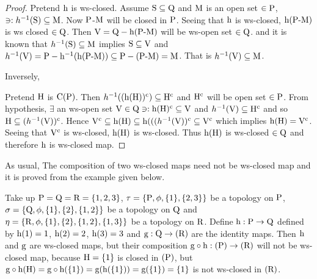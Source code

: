 \begin{proof}
Pretend $\mathrm{h}$ is ws-closed. Assume $\mathrm{S} \subseteq \mathrm{Q}$ and $\mathrm{M}$ is an open set $\in \mathrm{P}$, $\ni : h^{-1} (\mathrm{S}) \subseteq \mathrm{M}$.  Now $\mathrm{P}$-$\mathrm{M}$ will be closed in $\mathrm{P}$. Seeing that $\mathrm{h}$ is ws-closed, $\mathrm{h}(\mathrm{P}\text{-}\mathrm{M})$ is ws closed $\in\mathrm{Q}$. Then $\mathrm{V} = \mathrm{Q} - \mathrm{h} (\mathrm{P}\text{-}\mathrm{M})$ will be ws-open set $\in\mathrm{Q}$. and it is known that $h^{-1} (\mathrm{S}) \subseteq \mathrm{M}$ implies $\mathrm{S} \subseteq \mathrm{V}$ and $h^{-1}(\mathrm{V}) =\mathrm{P} - \mathrm{h}^{-1} (\mathrm{h}(\mathrm{P}\text{-}\mathrm{M})) \subseteq \mathrm{P} - (\mathrm{P}\text{-}\mathrm{M}) = \mathrm{M}$. That is $h^{-1}(\mathrm{V})\subseteq  \mathrm{M}$.

Inversely,

Pretend $\mathrm{H}$ is $\mathrm{C}(\mathrm{P})$. Then $h^{-1}((\mathrm{h} (\mathrm{H}))^{\text{c}}) \subseteq \mathrm{H}^{\text{c}}$ and $\mathrm{H}^{\text{c}}$ will be open set $\in\mathrm{P}$. From hypothesis, $\exists$ an ws-open set $\mathrm{V} \in \mathrm{Q} \ni: \mathrm{h}(\mathrm{H})^{\text{c}} \subseteq \mathrm{V}$ and $h^{-1}(\mathrm{V}) \subseteq \mathrm{H}^{\text{c}}$ and so $\mathrm{H} \subseteq (h^{-1} (\mathrm{V}))^{\text{c}}$. Hence $\mathrm{V}^{\text{c}} \subseteq \mathrm{h}(\mathrm{H}) \subseteq \mathrm{h}(((h^{-1} (\mathrm{V}))^{\text{c}} \subseteq \mathrm{V}^{\text{c}}$ which implies $\mathrm{h}(\mathrm{H}) = \mathrm{V}^{\text{c}}$. Seeing that $\mathrm{V}^{\text{c}}$ is ws-closed, $\mathrm{h} (\mathrm{H})$ is ws-closed. Thus $\mathrm{h} (\mathrm{H})$ is ws-closed $\in \mathrm{Q}$ and therefore $\mathrm{h}$ is ws-closed map.
\end{proof}

\begin{rem}\label{rem4.2.32}
As usual, The composition of two ws-closed maps need not be ws-closed map and it is proved from the example given below.
\end{rem}

\begin{exm}\label{exam4.2.33}
Take up $\mathrm{P} = \mathrm{Q} = \mathrm{R} = \{1,2,3\}$, $\tau=\{\mathrm{P}, \phi, \{1\}, \{2, 3\}\}$ be a topology on $\mathrm{P}$, $\sigma = \{\mathrm{Q}, \phi, \{1\},\{2\},\{1, 2\}\}$ be a topology on $\mathrm{Q}$ and $\eta = \{\TSR, \phi, \{1\}, \{2\},\break \{1, 2\}, \{1, 3\}\}$ be a topology on $\mathrm{R}$. Define $\mathrm{h}: \mathrm{P} \to \mathrm{Q}$ defined by $\mathrm{h}(1)=1$, $\mathrm{h}(2)=2$, $\mathrm{h}(3)=3$ and $\mathrm{g}: \mathrm{Q}\to (\mathrm{R})$ are the identity maps. Then $\mathrm{h}$ and $\mathrm{g}$ are ws-closed maps, but their composition $\mathrm{g}\circ \mathrm{h} : (\mathrm{P}) \to (\mathrm{R})$ will not be ws-closed map, because $\mathrm{H} = \{1\}$ is closed in $(\mathrm{P})$, but $\mathrm{g} \circ \mathrm{h} (\mathrm{H}) =\mathrm{g} \circ \mathrm{h} (\{1\}) = \mathrm{g}(\mathrm{h}(\{1\})) = \mathrm{g}(\{1\}) = \{1\}$ is not ws-closed in $(\mathrm{R})$.
\end{exm}

